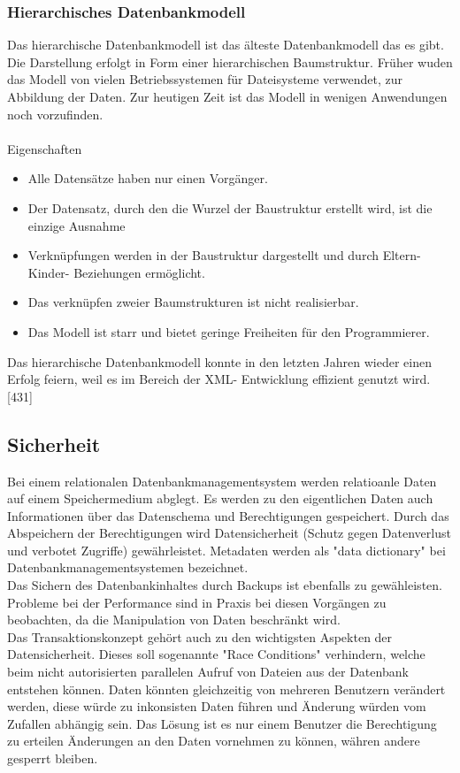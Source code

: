 \documentclass[12pt,a4paper]{report}
\begin{document}
\begin{onehalfspace}
\subsubsection{Hierarchisches Datenbankmodell}
Das hierarchische Datenbankmodell ist das älteste Datenbankmodell das es gibt. Die Darstellung erfolgt in Form einer hierarchischen Baumstruktur. Früher wuden das Modell von vielen Betriebssystemen für Dateisysteme verwendet, zur Abbildung der Daten. Zur heutigen Zeit ist das Modell in wenigen Anwendungen noch vorzufinden.\\
\\Eigenschaften
\begin{itemize}
\item Alle Datensätze haben nur einen Vorgänger.
\item Der Datensatz, durch den die Wurzel der Baustruktur erstellt wird, ist die einzige Ausnahme
\item Verknüpfungen werden in der Baustruktur dargestellt und durch Eltern- Kinder- Beziehungen ermöglicht.
\item Das verknüpfen zweier Baumstrukturen ist nicht realisierbar.
\item Das Modell ist starr und bietet geringe Freiheiten für den Programmierer.
\end{itemize}
Das hierarchische Datenbankmodell konnte in den letzten Jahren wieder einen Erfolg feiern, weil es im Bereich der XML- Entwicklung effizient genutzt wird. [431]

\subsection{Sicherheit}
Bei einem relationalen Datenbankmanagementsystem werden relatioanle Daten auf einem Speichermedium abglegt. Es werden zu den eigentlichen Daten auch Informationen über das Datenschema und Berechtigungen gespeichert. Durch das Abspeichern der Berechtigungen wird Datensicherheit (Schutz gegen Datenverlust und verbotet Zugriffe) gewährleistet. Metadaten werden als "{}data dictionary"{} bei Datenbankmanagementsystemen bezeichnet.\\

Das Sichern des Datenbankinhaltes durch Backups ist ebenfalls zu gewähleisten. Probleme bei der Performance sind in Praxis bei diesen Vorgängen zu beobachten, da die Manipulation von Daten beschränkt wird.\\

Das Transaktionskonzept gehört auch zu den wichtigsten Aspekten der Datensicherheit. Dieses soll sogenannte "{}Race Conditions"{} verhindern, welche beim nicht autorisierten parallelen Aufruf von Dateien aus der Datenbank entstehen können. Daten könnten gleichzeitig von mehreren Benutzern verändert werden, diese würde zu inkonsisten Daten führen und Änderung würden vom Zufallen abhängig sein. Das Lösung ist es nur einem Benutzer die Berechtigung zu erteilen Änderungen an den Daten vornehmen zu können, währen andere gesperrt bleiben.\\


\end{onehalfspace}
\end{document}
